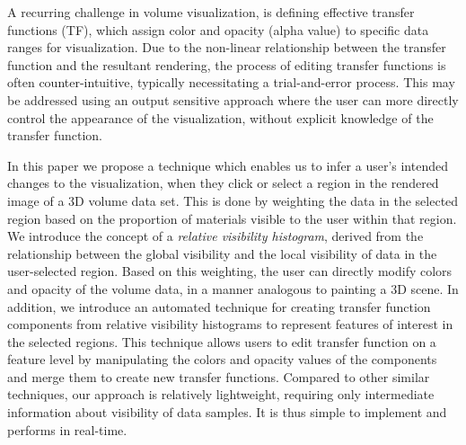 \documentclass[twoside,twocolumn,10pt]{article}
\begin{document}
A recurring challenge in volume visualization, is defining effective transfer functions (TF), which assign color and opacity (alpha value) to specific data ranges for visualization. Due to the non-linear relationship between the transfer function and the resultant rendering, the process of editing transfer functions is often counter-intuitive, typically necessitating a trial-and-error process. This may be addressed using an output sensitive approach where the user can more directly control the appearance of the visualization, without explicit knowledge of the transfer function. 

In this paper we propose a technique which enables us to infer a user's intended changes to the visualization, when they click or select a region in the rendered image of a 3D volume data set. This is done by weighting the data in the selected region based on the proportion of materials visible to the user within that region. We introduce the concept of a \emph{relative visibility histogram}, derived from the relationship between the global visibility and the local visibility of data in the user-selected region.
Based on this weighting, the user can directly modify colors and opacity of the volume data, in a manner analogous to painting a 3D scene.
In addition, we introduce an automated technique for creating transfer function components from relative visibility histograms to represent features of interest in the selected regions.
This technique allows users to edit transfer function on a feature level by manipulating the colors and opacity values of the components and merge them to create new transfer functions.
Compared to other similar techniques, our approach is relatively lightweight, requiring only intermediate information about visibility of data samples. It is thus simple to implement and performs in real-time.


\end{document}
